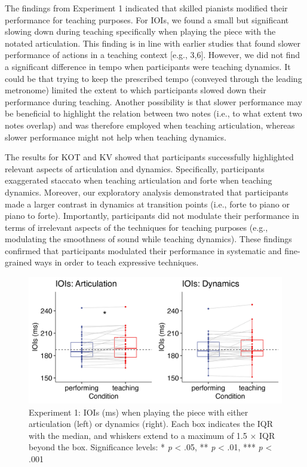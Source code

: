 \documentclass[
  english,
  man,floatsintext]{apa6}
\begin{document}
The findings from Experiment 1 indicated that skilled pianists modified their performance for teaching purposes. For IOIs, we found a small but significant slowing down during teaching specifically when playing the piece with the notated articulation. This finding is in line with earlier studies that found slower performance of actions in a teaching context {[}e.g., 3,6{]}. However, we did not find a significant difference in tempo when participants were teaching dynamics. It could be that trying to keep the prescribed tempo (conveyed through the leading metronome) limited the extent to which participants slowed down their performance during teaching. Another possibility is that slower performance may be beneficial to highlight the relation between two notes (i.e., to what extent two notes overlap) and was therefore employed when teaching articulation, whereas slower performance might not help when teaching dynamics.

The results for KOT and KV showed that participants successfully highlighted relevant aspects of articulation and dynamics. Specifically, participants exaggerated staccato when teaching articulation and forte when teaching dynamics. Moreover, our exploratory analysis demonstrated that participants made a larger contrast in dynamics at transition points (i.e., forte to piano or piano to forte). Importantly, participants did not modulate their performance in terms of irrelevant aspects of the techniques for teaching purposes (e.g., modulating the smoothness of sound while teaching dynamics). These findings confirmed that participants modulated their performance in systematic and fine-grained ways in order to teach expressive techniques.

\begin{figure}
\includegraphics[width=1\linewidth]{manuscript_files/figure-latex/plot-ioi-1-1} \caption{\label{fig:ioi-1}Experiment 1: IOIs (ms) when playing the piece with either articulation (left) or dynamics (right). Each box indicates the IQR with the median, and whiskers extend to a maximum of 1.5 × IQR beyond the box. Significance levels: * \textit{p} < .05, ** \textit{p} < .01, *** \textit{p} < .001}\label{fig:plot-ioi-1}
\end{figure}
\end{document}
